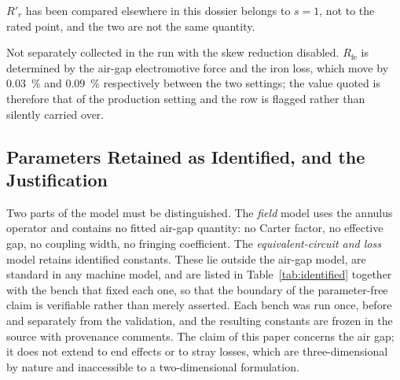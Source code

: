 \documentclass[10pt,a4paper,twocolumn]{article}
\theoremstyle{plain}
\theoremstyle{remark}
\begin{document}
\begin{table}[!ht]
\begin{threeparttable}
\begin{tablenotes}[flushleft]
$R'_r$ has been compared elsewhere in this dossier belongs to
$s=1$, not to the rated point, and the two are not the same quantity.
\item[b] Not separately collected in the run with the skew reduction
disabled. $R_{\mathrm{fe}}$ is determined by the air-gap electromotive
force and the iron loss, which move by \SI{0.03}{\percent} and
\SI{0.09}{\percent} respectively between the two settings; the value
quoted is therefore that of the production setting and the row is
flagged rather than silently carried over.
\end{tablenotes}
\end{threeparttable}
\caption{Induction machine: equivalent circuit and rated point,
$s=\num{0.0188}$, hat basis, harmonic skew reduction disabled.}
\label{tab:im_ec}
\end{table}

\subsection{Parameters Retained as Identified, and the Justification}
\label{sub:identified}

Two parts of the model must be distinguished. The \emph{field} model
uses the annulus operator and contains no fitted air-gap quantity: no
Carter factor, no effective gap, no coupling width, no fringing
coefficient. The \emph{equivalent-circuit and loss} model retains
identified constants. These lie outside the air-gap model, are standard
in any machine model, and are listed in Table~\ref{tab:identified}
together with the bench that fixed each one, so that the boundary of the
parameter-free claim is verifiable rather than merely asserted. Each
bench was run once, before and separately from the validation, and the
resulting constants are frozen in the source with provenance comments.
The claim of this paper concerns the air gap; it does not extend to end
effects or to stray losses, which are three-dimensional by nature and
inaccessible to a two-dimensional formulation.
\end{document}
